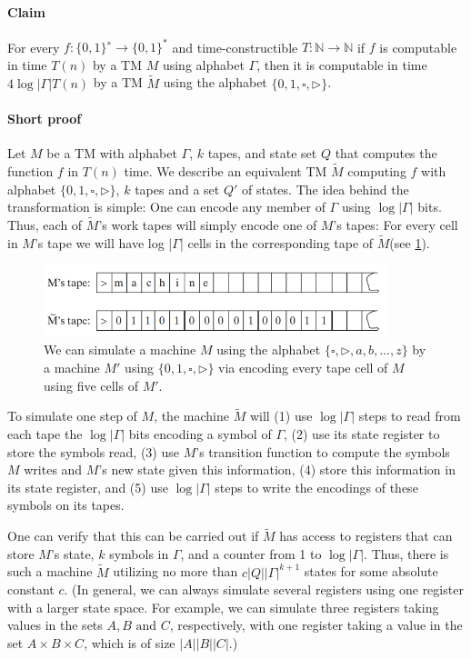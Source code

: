 \documentclass[a4paper]{article}
\begin{document}
\paragraph{Claim}

For every $f : \{0, 1\}^{∗} \rightarrow \{0, 1\}^{*}$ and time-constructible $T :  \mathbb{N} →  \mathbb{N}$ if $f$ is
computable in time $T(n)$ by a TM $M$ using alphabet $\Gamma$, then it is computable in time $4 \log{|\Gamma|}T(n)$ by a TM $\widetilde{M}$ using the alphabet $\{0, 1, \square, \rhd \}$.

\paragraph{Short proof}

Let $M$ be a TM with alphabet $\Gamma$, $k$ tapes, and state set $Q$ that computes
the function $f$ in $T(n)$ time. We describe an equivalent TM $\widetilde{M}$ computing $f$ with alphabet $\{0, 1, \square, \rhd \}$, $k$ tapes and a set $Q'$ of states. The idea behind the transformation is simple:
One can encode any member of $\Gamma$ using $\log |\Gamma|$ bits. Thus, each of $\widetilde{M}$'s work tapes will
simply encode one of $M$’s tapes: For every cell in $M$'s tape we will have log |$\Gamma$| cells in
the corresponding tape of $\widetilde{M}$(see \ref{fig:scetch1}).

\begin{figure}[!ht]
\centering
\includegraphics[width=10cm]{scetch1.png}
\caption{We can simulate a machine $M$ using the alphabet $\{\square, \rhd, a, b, ..., z \}$ by a machine $M'$ using $\{0, 1, \square, \rhd \}$ via encoding every tape cell of $M$ using five cells of $M'$.}
\label{fig:scetch1}
\end{figure}

\par	
To simulate one step of $M$, the machine $\widetilde{M}$ will (1) use $\log |\Gamma|$ steps to read from
each tape the $\log |\Gamma|$ bits encoding a symbol of $\Gamma$, (2) use its state register to store the
symbols read, (3) use $M$’s transition function to compute the symbols $M$ writes and $M$'s
new state given this information, (4) store this information in its state register, and (5)
use $\log |\Gamma|$ steps to write the encodings of these symbols on its tapes.
\par 
One can verify that this can be carried out if $\widetilde{M}$ has access to registers that can
store $M$'s state, $k$ symbols in $\Gamma$, and a counter from 1 to $\log |\Gamma|$. Thus, there is such a
machine $\widetilde{M}$ utilizing no more than $c|Q||\Gamma|^{k+1}$ states for some absolute constant $c$. (In
general, we can always simulate several registers using one register with a larger state
space. For example, we can simulate three registers taking values in the sets $A, B \text{ and } C$, respectively, with one register taking a value in the set $A \times B \times C$, which is of size $|A| |B| |C|$.)
\end{document}
